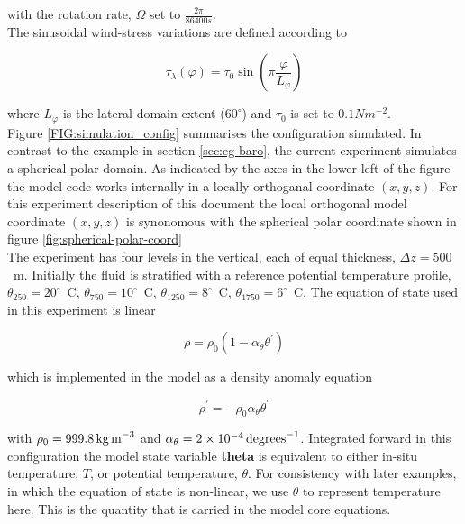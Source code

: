 \noindent with the rotation rate, $\Omega$ set to $\frac{2 \pi}{86400s}$.
\\
  
 The sinusoidal wind-stress variations are defined according to 

\begin{equation}
\label{EQ:taux}
\tau_{\lambda}(\varphi) = \tau_{0}\sin(\pi \frac{\varphi}{L_{\varphi}})
\end{equation}
 
\noindent where $L_{\varphi}$ is the lateral domain extent ($60^{\circ}$) and 
$\tau_0$ is set to $0.1N m^{-2}$. 
\\

Figure \ref{FIG:simulation_config}
summarises the configuration simulated.
In contrast to the example in section \ref{sec:eg-baro}, the 
current experiment simulates a spherical polar domain. As indicated
by the axes in the lower left of the figure the model code works internally
in a locally orthoganal coordinate $(x,y,z)$. For this experiment description 
of this document the local orthogonal model coordinate $(x,y,z)$ is synonomous 
with the spherical polar coordinate shown in figure 
\ref{fig:spherical-polar-coord}
\\

The experiment has four levels in the vertical, each of equal thickness,
$\Delta z = 500$~m. Initially the fluid is stratified with a reference
potential temperature profile,
$\theta_{250}=20^{\circ}$~C,
$\theta_{750}=10^{\circ}$~C,
$\theta_{1250}=8^{\circ}$~C,
$\theta_{1750}=6^{\circ}$~C. The equation of state used in this experiment is 
linear

\begin{equation}
\label{EQ:linear1_eos}
\rho = \rho_{0} ( 1 - \alpha_{\theta}\theta^{'} )
\end{equation}

\noindent which is implemented in the model as a density anomaly equation

\begin{equation}
\label{EQ:linear1_eos_pert}
\rho^{'} = -\rho_{0}\alpha_{\theta}\theta^{'}
\end{equation}

\noindent with $\rho_{0}=999.8\,{\rm kg\,m}^{-3}$ and 
$\alpha_{\theta}=2\times10^{-4}\,{\rm degrees}^{-1} $. Integrated forward in
this configuration the model state variable {\bf theta} is equivalent to
either in-situ temperature, $T$, or potential temperature, $\theta$. For 
consistency with later examples, in which the equation of state is
non-linear, we use $\theta$ to represent temperature here. This is
the quantity that is carried in the model core equations.

